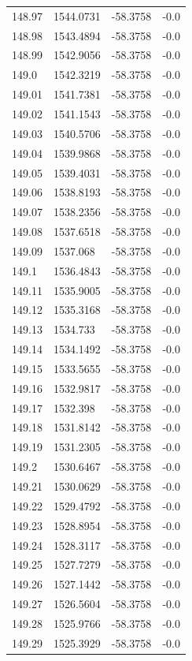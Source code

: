 \begin{table}[H]
\begin{tabular}{llll}
148.97 & 1544.0731 & -58.3758 & -0.0 \\
148.98 & 1543.4894 & -58.3758 & -0.0 \\
148.99 & 1542.9056 & -58.3758 & -0.0 \\
149.0 & 1542.3219 & -58.3758 & -0.0 \\
149.01 & 1541.7381 & -58.3758 & -0.0 \\
149.02 & 1541.1543 & -58.3758 & -0.0 \\
149.03 & 1540.5706 & -58.3758 & -0.0 \\
149.04 & 1539.9868 & -58.3758 & -0.0 \\
149.05 & 1539.4031 & -58.3758 & -0.0 \\
149.06 & 1538.8193 & -58.3758 & -0.0 \\
149.07 & 1538.2356 & -58.3758 & -0.0 \\
149.08 & 1537.6518 & -58.3758 & -0.0 \\
149.09 & 1537.068 & -58.3758 & -0.0 \\
149.1 & 1536.4843 & -58.3758 & -0.0 \\
149.11 & 1535.9005 & -58.3758 & -0.0 \\
149.12 & 1535.3168 & -58.3758 & -0.0 \\
149.13 & 1534.733 & -58.3758 & -0.0 \\
149.14 & 1534.1492 & -58.3758 & -0.0 \\
149.15 & 1533.5655 & -58.3758 & -0.0 \\
149.16 & 1532.9817 & -58.3758 & -0.0 \\
149.17 & 1532.398 & -58.3758 & -0.0 \\
149.18 & 1531.8142 & -58.3758 & -0.0 \\
149.19 & 1531.2305 & -58.3758 & -0.0 \\
149.2 & 1530.6467 & -58.3758 & -0.0 \\
149.21 & 1530.0629 & -58.3758 & -0.0 \\
149.22 & 1529.4792 & -58.3758 & -0.0 \\
149.23 & 1528.8954 & -58.3758 & -0.0 \\
149.24 & 1528.3117 & -58.3758 & -0.0 \\
149.25 & 1527.7279 & -58.3758 & -0.0 \\
149.26 & 1527.1442 & -58.3758 & -0.0 \\
149.27 & 1526.5604 & -58.3758 & -0.0 \\
149.28 & 1525.9766 & -58.3758 & -0.0 \\
149.29 & 1525.3929 & -58.3758 & -0.0 \\

\end{tabular}
\end{table}
